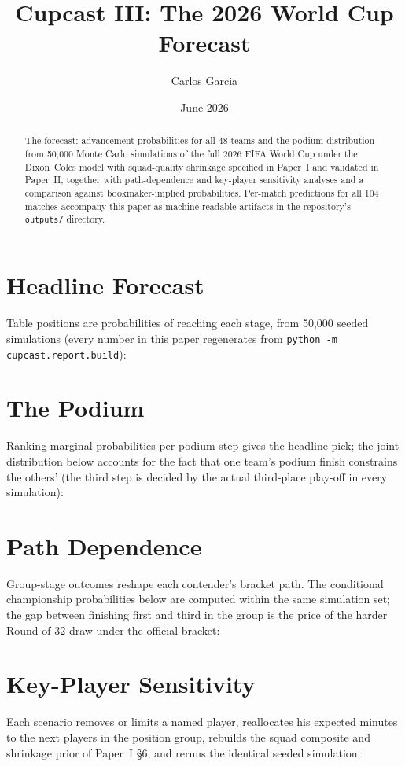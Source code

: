 \documentclass[11pt]{article}
\title{Cupcast III: The 2026 World Cup Forecast}
\author{Carlos Garcia}
\date{June 2026}
\begin{document}
\maketitle

\begin{abstract}
The forecast: advancement probabilities for all 48 teams and the podium
distribution from 50{,}000 Monte Carlo simulations of the full 2026 FIFA World
Cup under the Dixon--Coles model with squad-quality shrinkage \cite{dixoncoles1997}
specified in Paper~I and validated in Paper~II, together with path-dependence
and key-player sensitivity analyses and a comparison against bookmaker-implied
probabilities. Per-match predictions for all 104 matches accompany this paper
as machine-readable artifacts in the repository's \texttt{outputs/} directory.
\end{abstract}

\section{Headline Forecast}
Table positions are probabilities of reaching each stage, from 50{,}000 seeded
simulations (every number in this paper regenerates from
\texttt{python -m cupcast.report.build}):



\section{The Podium}
Ranking marginal probabilities per podium step gives the headline pick;
the joint distribution below accounts for the fact that one team's podium
finish constrains the others' (the third step is decided by the actual
third-place play-off in every simulation):



\section{Path Dependence}
Group-stage outcomes reshape each contender's bracket path. The conditional
championship probabilities below are computed within the same simulation set;
the gap between finishing first and third in the group is the price of the
harder Round-of-32 draw under the official bracket:



\section{Key-Player Sensitivity}
Each scenario removes or limits a named player, reallocates his expected
minutes to the next players in the position group, rebuilds the squad
composite and shrinkage prior of Paper~I \S6, and reruns the identical seeded
simulation:
\end{document}

